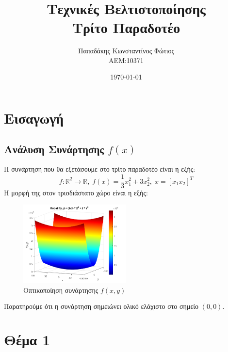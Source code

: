 \documentclass{report}
\begin{document}

\title{\Huge \bfseries Τεχνικές Βελτιστοποίησης \\ Τρίτο Παραδοτέο} %
\author{Παπαδάκης Κωνσταντίνος Φώτιος\vspace{0.5cm} \\  ΑΕΜ:10371} %
\date{\today}
\maketitle

\tableofcontents

\chapter{Εισαγωγή}
\section{Ανάλυση Συνάρτησης $f(x)$}
Η συνάρτηση που θα εξετάσουμε στο τρίτο παραδοτέο είναι η εξής:
$$ f: \mathbb{R}^2 \to \mathbb{R},\; f(x) = \frac{1}{3} x_1^2 + 3x_2^2,\; x = [x_1 x_2]^T$$
Η μορφή της στον τρισδιάστατο χώρο είναι η εξής:
\begin{figure}[H]
    \centering
    \includegraphics[width=0.5\textwidth]{media/visual.png}
    \caption{Οπτικοποίηση συνάρτησης $f(x,y)$}
\end{figure} 
Παρατηρούμε ότι η συνάρτηση σημειώνει ολικό ελάχιστο στο σημείο $(0,0)$.

\chapter{Θέμα 1}
\end{document}
